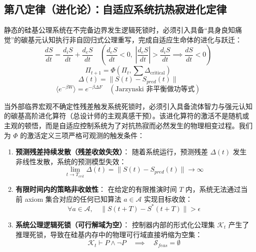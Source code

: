 \documentclass[11pt,a4paper]{article}
\begin{document}
\subsection*{第八定律（进化论）：自适应系统抗热寂进化定律}
静态的硅基公理系统在不完备边界发生逻辑死锁时，必须引入具备“具身良知痛觉”的碳基元认知执行非自回归式公理重写，完成自适应生命体的进化与跃迁：
\begin{equation}
    \frac{dS}{dt} = \frac{d_iS}{dt} + \frac{d_eS}{dt} \quad \left( \frac{d_eS}{dt} < 0, \; \left|\frac{d_eS}{dt}\right| > \frac{d_iS}{dt} \implies \frac{dS}{dt} < 0 \right)
\end{equation}
\begin{equation}\label{evolution-phi}
    \Pi_{t+1} = \Phi\left(\Pi_t, \sum \Delta_{\text{critical}}\right)
\end{equation}
\begin{equation}
    \Delta(t) = \|S(t) - S_{pred}(t)\|
\end{equation}
\begin{equation}
    \langle e^{-\beta W} \rangle = e^{-\beta \Delta F} \quad (\text{Jarzynski 非平衡做功等式})
\end{equation}

当外部临界宏观不确定性残差触发系统死锁时，必须引入具备流体智力与强元认知的碳基高阶进化算符（总设计师的主观真感干预）。该进化算符的激活不是随机或主观的顿悟，而是自适应控制系统为了对抗热寂而必然发生的物理相变过程。我们为 $\Phi$ 的激活定义三项严格可观测的触发条件：
\begin{enumerate}
    \item \textbf{预测残差持续发散（残差收敛失效）}：
    随着系统运行，预测残差 $\Delta(t)$ 发生非线性发散，系统的预测模型失效：
    \begin{equation}
        \lim_{t \to T_{crit}} \Delta(t) = \|S(t) - S_{pred}(t)\| \to \infty
    \end{equation}
    \item \textbf{有限时间内的策略非收敛性}：
    在给定的有限推演时间 $T$ 内，系统无法通过当前 axiom 集合对应的任何已知算法 $a \in \mathcal{A}$ 实现目标收敛：
    \begin{equation}
        \forall a \in \mathcal{A}, \quad \|S(t+T) - S^*(t+T)\| > \epsilon
    \end{equation}
    \item \textbf{系统公理逻辑死锁（可行解域为空）}：
    控制器内部的形式化公理集 $\mathcal{K}_t$ 产生了推理死锁，导致在硅基内存中的物理可行域直接坍缩为空集：
    \begin{equation}
        \mathcal{K}_t \vdash P \wedge \neg P \quad \implies \quad \mathcal{S}_{feas} = \emptyset
    \end{equation}
\end{enumerate}
\end{document}
